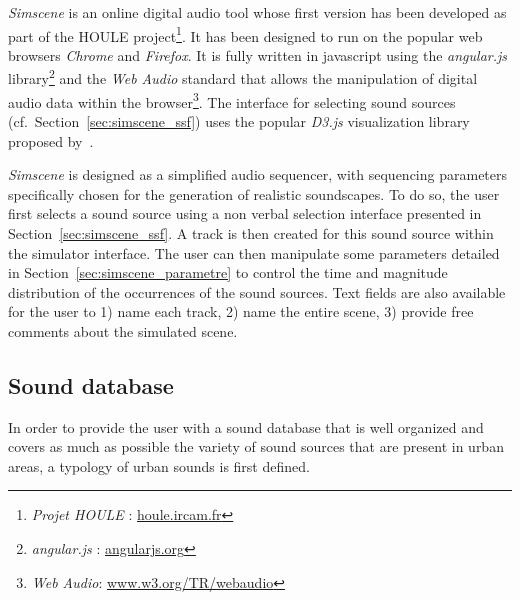 \documentclass[12pt]{elsarticle}
\newcommand{\cf}{cf.}
\begin{document}
\emph{Simscene} is an online digital audio tool whose first version has been developed as part of the HOULE project\footnote{\emph{Projet HOULE} : \url{houle.ircam.fr}}. It has been designed to run on the popular web browsers \emph{Chrome} and \emph{Firefox}. It is fully written in javascript using the \emph{angular.js} library\footnote{\emph{angular.js} : \url{angularjs.org}} and the \emph{Web Audio} standard that allows the manipulation of digital audio data within the browser\footnote{\emph{Web Audio}: \url{www.w3.org/TR/webaudio}}. The interface for selecting sound sources (\cf~Section~\ref{sec:simscene_ssf}) uses the popular \emph{D3.js} visualization library proposed by~\cite{d32011}.


\emph{Simscene} is designed as a simplified audio sequencer, with sequencing parameters specifically chosen for the generation of realistic soundscapes. To do so, the user first selects a sound source using a non verbal selection interface presented in Section~\ref{sec:simscene_ssf}. A track is then created for this sound source within the simulator interface. The user can then manipulate some parameters detailed in Section~\ref{sec:simscene_parametre} to control the time and magnitude distribution of the occurrences of the sound sources. Text fields are also available for the user to 1) name each track, 2) name the entire scene, 3) provide free comments about the simulated scene.

\subsection{Sound database}
\label{sec:simscene_sampleDataSet}


In order to provide the user with a sound database that is well organized and covers as much as possible the variety of sound sources that are present in urban areas, a typology of urban sounds is first defined.
\end{document}
